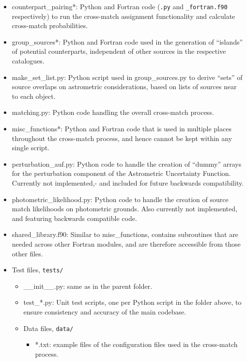 \documentclass[a4paper,11pt]{scrartcl}
\begin{document}
\begin{itemize}
\begin{itemize}
		\item counterpart\_pairing*: Python and Fortran code (\texttt{.py} and \texttt{\_fortran.f90} respectively) to run the cross-match assignment functionality and calculate cross-match probabilities.
		\item group\_sources*: Python and Fortran code used in the generation of ``islands'' of potential counterparts, independent of other sources in the respective catalogues.
		\item make\_set\_list.py: Python script used in group\_sources.py to derive ``sets'' of source overlaps on astrometric considerations, based on lists of sources near to each object.
		\item matching.py: Python code handling the overall cross-match process.
		\item misc\_functions*: Python and Fortran code that is used in multiple places throughout the cross-match process, and hence cannot be kept within any single script.
		\item perturbation\_auf.py: Python code to handle the creation of ``dummy'' arrays for the perturbation component of the Astrometric Uncertainty Function. Currently not implemented,- and included for future backwards compatibility.
		\item photometric\_likelihood.py: Python code to handle the creation of source match likelihoods on photometric grounds. Also currently not implemented, and featuring backwards compatible code.
		\item shared\_library.f90: Similar to misc\_functions, contains subroutines that are needed across other Fortran modules, and are therefore accessible from those other files.
		\item Test files, \texttt{tests/}
		\begin{itemize}
			\item \_\_init\_\_.py: same as in the parent folder.
			\item test\_*.py: Unit test scripts, one per Python script in the folder above, to ensure consistency and accuracy of the main codebase.
			\item Data files, \texttt{data/}
			\begin{itemize}
				\item *.txt: example files of the configuration files used in the cross-match process.
			\end{itemize}
		\end{itemize}
	\end{itemize}
\end{itemize}
\end{document}

